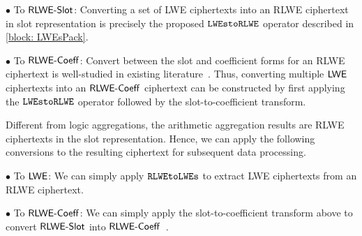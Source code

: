 $\bullet$ To ${\mathsf{RLWE\text{-}Slot}}$: %
Converting a set of LWE ciphertexts into an 
RLWE ciphertext in slot representation is precisely the proposed
$\texttt{LWEstoRLWE}$ operator described in \cref{block: LWEsPack}.

$\bullet$ To ${\mathsf{RLWE\text{-}Coeff}}$: %
    Convert between the slot and coefficient forms for an RLWE ciphertext
    is well-studied in existing 
    literature~\cite{DBLP:journals/access/s2cc2s, betterboot, improvedboot, inverseboot}. 
    Thus, converting multiple ${\mathsf{LWE}}$ ciphertexts into an ${\mathsf{RLWE\text{-}Coeff}}$ ciphertext
    can be constructed by first applying the $\texttt{LWEstoRLWE}$ operator followed
    by the slot-to-coefficient transform.

Different from logic aggregations, the arithmetic aggregation results 
are RLWE ciphertexts in the 
slot representation. Hence, we can apply the following conversions to
the resulting ciphertext for subsequent data processing.

$\bullet$ To ${\mathsf{LWE}}$: %
We can simply apply $\texttt{RLWEtoLWEs}$ to
extract LWE ciphertexts from an RLWE ciphertext.

$\bullet$ To ${\mathsf{RLWE\text{-}Coeff}}$: We can simply apply
the slot-to-coefficient transform above to convert 
${\mathsf{RLWE\text{-}Slot}}$ into ${\mathsf{RLWE\text{-}Coeff}}$~\cite{DBLP:journals/access/s2cc2s}.




